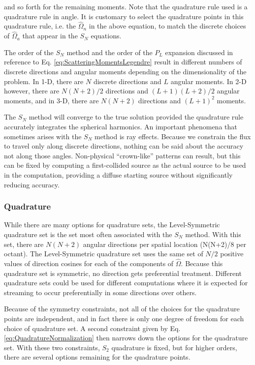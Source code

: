 \documentclass[10pt]{article}
\newcommand{\hO}{\hat{\Omega}}
\newcounter{subsubsubsection}[subsubsection]
\begin{document}
\begin{flushleft}
and so forth for the remaining moments. Note that the quadrature rule used is a quadrature rule in angle. It is customary to select the quadrature points in this quadrature rule, i.e. the \(\hO  _n\) in the above equation, to match the discrete choices of \(\hO  _a\) that appear in the \(S_N\) equations. 

The order of the \(S_N\) method and the order of the \(P_L\) expansion discussed in reference to Eq. \ref{eq:ScatteringMomentsLegendre} result in different numbers of discrete directions and angular moments depending on the dimensionality of the problem. In 1-D, there are \(N\) discrete directions and \(L\) angular moments. In 2-D however, there are \(N(N+2)/2\) directions and \((L+1)(L+2)/2\) angular moments, and in 3-D, there are \(N(N+2)\) directions and \((L+1)^2\) moments. 

The \(S_N\) method will converge to the true solution provided the quadrature rule accurately integrates the spherical harmonics. An important phenomena that sometimes arises with the \(S_N\) method is ray effects. Because we constrain the flux to travel only along discrete directions, nothing can be said about the accuracy not along those angles. Non-physical ``crown-like'' patterns can result, but this can be fixed by computing a first-collided source as the actual source to be used in the computation, providing a diffuse starting source without significantly reducing accuracy. 

\subsubsection{Quadrature}

While there are many options for quadrature sets, the Level-Symmetric quadrature set is the set most often associated with the \(S_N\) method. With this set, there are \(N(N+2)\) angular directions per spatial location (N(N+2)/8 per octant). The Level-Symmetric quadrature set uses the same set of \(N/2\) positive values of direction cosines for each of the components of \(\hO  \). Because this quadrature set is symmetric, no direction gets preferential treatment. Different quadrature sets could be used for different computations where it is expected for streaming to occur preferentially in some directions over others. 

Because of the symmetry constraints, not all of the choices for the quadrature points are independent, and in fact there is only one degree of freedom for each choice of quadrature set. A second constraint given by Eq. \eqref{eq:QuadratureNormalization} then narrows down the options for the quadrature set. With these two constraints, \(S_2\) quadrature is fixed, but for higher orders, there are several options remaining for the quadrature points. 


\end{flushleft}
\end{document}
